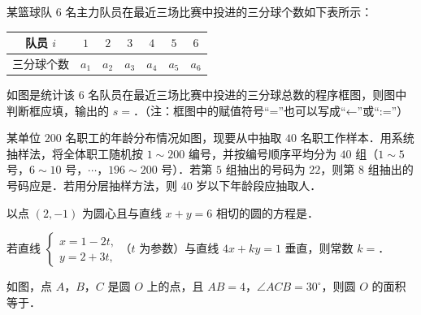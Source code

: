 \Needspace{0.4\textheight}
\begingroup
\renewenvironment{question}{\Needspace{0.5\textheight}}{}
\begin{question}
某篮球队 $6$ 名主力队员在最近三场比赛中投进的三分球个数如下表所示：

\begin{center}
\begin{tabular}{ccccccc}
\toprule
队员 $i$ & $1$ & $2$ & $3$ & $4$ & $5$ & $6$ \\
\midrule
三分球个数 & $a_1$ & $a_2$ & $a_3$ & $a_4$ & $a_5$ & $a_6$ \\
\bottomrule
\end{tabular}
\end{center}

如图是统计该 $6$ 名队员在最近三场比赛中投进的三分球总数的程序框图，则图中判断框应填\gkblank{}，输出的 $s=$\gkblank{}．（注：框图中的赋值符号“=”也可以写成“←”或“:=”）
\nopagebreak[4]
\begin{center}\end{center}
\nopagebreak[4]
\Needspace{0.4\textheight}
\end{question}
\endgroup
\begingroup
\renewenvironment{question}{\Needspace{0.45\textheight}}{}
\begin{question}
某单位 $200$ 名职工的年龄分布情况如图，现要从中抽取 $40$ 名职工作样本．用系统抽样法，将全体职工随机按 $1\sim200$ 编号，并按编号顺序平均分为 $40$ 组（$1\sim5$ 号，$6\sim10$ 号，$\cdots$，$196\sim200$ 号）．若第 $5$ 组抽出的号码为 $22$，则第 $8$ 组抽出的号码应是\gkblank{}．若用分层抽样方法，则 $40$ 岁以下年龄段应抽取\gkblank{}人．
\nopagebreak[4]
\begin{center}\end{center}
\nopagebreak[4]
\end{question}
\endgroup
\begin{question}
以点 $(2,-1)$ 为圆心且与直线 $x+y=6$ 相切的圆的方程是\gkblank{}．

\end{question}
\begin{question}
若直线 $\begin{cases}x=1-2t,\\ y=2+3t,\end{cases}$（$t$ 为参数）与直线 $4x+ky=1$ 垂直，则常数 $k=$\gkblank{}．

\Needspace{0.4\textheight}
\end{question}
\begingroup
\renewenvironment{question}{\Needspace{0.45\textheight}}{}
\begin{question}
如图，点 $A$，$B$，$C$ 是圆 $O$ 上的点，且 $AB=4$，$\angle ACB=30^\circ$，则圆 $O$ 的面积等于\gkblank{}．
\nopagebreak[4]
\begin{center}\end{center}
\nopagebreak[4]
\end{question}
\endgroup
{}

